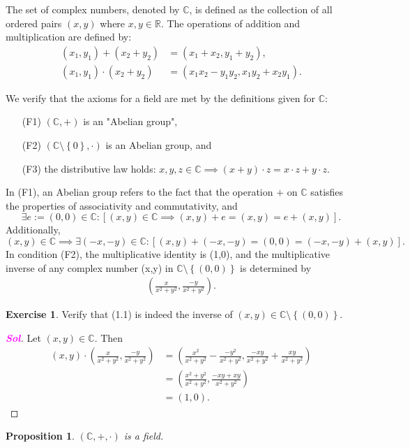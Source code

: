\documentclass[12pt,openany]{book}
\newtheorem{proposition}[theorem]{Proposition}
\theoremstyle{definition}
\newtheorem{exercise}{Exercise}[section]
\newcommand{\set}[1]{\left\{#1\right\}}
\newcommand{\R}{\mathbb{R}}
\newcommand{\C}{\mathbb{C}}
\newcommand{\of}[1]{\left( #1 \right)}
\newcommand{\sol}{\textcolor{magenta}{\bf Sol}}
\begin{document}
	The set of complex numbers, denoted by $\C$, is defined as the collection of all ordered pairs $(x,y)$ where $x,y\in\R$. The operations of addition and multiplication are defined by:\begin{align*}
	(x_1,y_1)+(x_2+y_2)&=(x_1+x_2,y_1+y_2),\\
	(x_1,y_1)\cdot(x_2+y_2)&=(x_1x_2-y_1y_2,x_1y_2+x_2y_1).
	\end{align*}
	
	We verify that the axioms for a field are met by the definitions given for $\C$: \begin{itemize}
		\item[(F1)] $\of{\C,+}$ is an "Abelian group",
		\item[(F2)] $\of{\C\setminus\set{0},\cdot}$ is an Abelian group, and
		\item[(F3)] the distributive law holds: $x,y,z\in\C\implies\of{x+y}\cdot z=x\cdot z+y\cdot z$.
	\end{itemize}
	
	In (F1), an Abelian group refers to the fact that the operation $+$ on $\C$ satisfies the properties of associativity and commutativity, and \[
	\exists e:=(0,0)\in\C:[(x,y)\in\C\implies(x,y)+e=(x,y)=e+(x,y)].
	\] Additionally, \[
	(x,y)\in\C\implies\exists(-x,-y)\in\C:[(x,y)+(-x,-y)=(0,0)=(-x,-y)+(x,y)].
	\] In condition (F2), the multiplicative identity is (1,0), and the multiplicative inverse of any complex number (x,y) in $\C\setminus\set{(0,0)}$ is determined by \begin{align}
	\of{\frac{x}{x^2+y^2},\frac{-y}{x^2+y^2}}.
	\end{align}
	
	\begin{exercise}
		Verify that (1.1) is indeed the inverse of $(x,y)\in\C\setminus\set{(0,0)}$.
		\begin{proof}[\sol]
			Let $(x,y)\in\C$. Then \begin{align*}
			(x,y)\cdot\of{\frac{x}{x^2+y^2},\frac{-y}{x^2+y^2}}
			&=\of{\frac{x^2}{x^2+y^2}-\frac{-y^2}{x^2+y^2},\frac{-xy}{x^2+y^2}+\frac{xy}{x^2+y^2}}\\
			&=\of{\frac{x^2+y^2}{x^2+y^2},\frac{-xy+xy}{x^2+y^2}}\\
			&=(1,0).
			\end{align*}
		\end{proof}
	\end{exercise}
	
	\begin{tcolorbox}[colback=white,colframe=procolor, title={\color{white}\bf Complex Numbers are Field}]
		\begin{proposition}
			$\of{\C,+,\cdot}$ is a field.
		\end{proposition}
	\end{tcolorbox}
	
\end{document}

